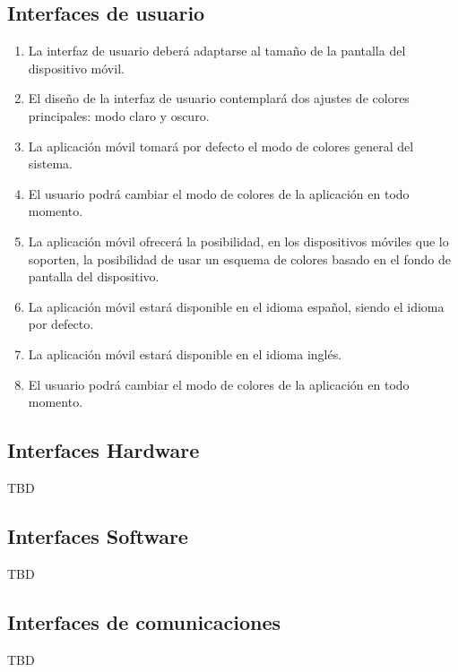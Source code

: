     \subsection{Interfaces de usuario}
        \begin{enumerate}[label=\textbf{\texttt{RIU-\arabic*}}]
            \item La interfaz de usuario deberá adaptarse al tamaño de la pantalla del dispositivo móvil.
            \item El diseño de la interfaz de usuario contemplará dos ajustes de colores principales: modo claro y oscuro.
            \item La aplicación móvil tomará por defecto el modo de colores general del sistema.
            \item El usuario podrá cambiar el modo de colores de la aplicación en todo momento. 
            \item La aplicación móvil ofrecerá la posibilidad, en los dispositivos móviles que lo soporten, la posibilidad de usar un esquema de colores basado en el fondo de pantalla del dispositivo.
            \item La aplicación móvil estará disponible en el idioma español, siendo el idioma por defecto.
            \item La aplicación móvil estará disponible en el idioma inglés.
            \item El usuario podrá cambiar el modo de colores de la aplicación en todo momento.
        \end{enumerate}

    \subsection{Interfaces Hardware}
        TBD
    
    \subsection{Interfaces Software}
        TBD
    
    \subsection{Interfaces de comunicaciones}
        TBD

